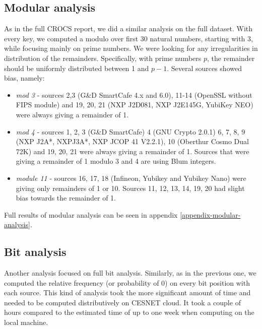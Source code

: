 \subsection{Modular analysis}

As in the full CROCS report\cite{svenda_full}, we did a similar analysis on the full dataset. With every key, we computed a modulo over first 30 natural numbers, starting with 3, while focusing mainly on prime numbers. We were looking for any irregularities in distribution of the remainders. Specifically, with prime numbers $p$, the remainder should be uniformly distributed between 1 and $p-1$. Several sources showed bias, namely:

\begin{itemize}

\item \textit{mod 3} - sources 2,3 (G\&D SmartCafe 4.x and 6.0), 11-14 (OpenSSL without FIPS module) and 19, 20, 21 (NXP J2D081, NXP J2E145G, YubiKey NEO) were always giving a remainder of 1.

\item \textit{mod 4} - sources 1, 2, 3 (G\&D SmartCafe) 4 (GNU Crypto 2.0.1) 6, 7, 8, 9 (NXP J2A*, NXPJ3A*, NXP JCOP 41 V2.2.1), 10 (Oberthur Cosmo Dual 72K) and 19, 20, 21 were always giving a remainder of 1. Sources that were giving a remainder of 1 modulo 3 and 4 are using Blum integers.

\item \textit{module 11} - sources 16, 17, 18 (Infineon, Yubikey and Yubikey Nano) were giving only remainders of 1 or 10. Sources 11, 12, 13, 14, 19, 20 had slight bias towards the remainder of 1.

\end{itemize}

\noindent
Full results of modular analysis can be seen in appendix \ref{appendix-modular-analysis}.

\subsection{Bit analysis}

Another analysis focused on full bit analysis. Similarly, as in the previous one, we computed the relative frequency (or probability of 0) on every bit position with each source. This kind of analysis took the more significant amount of time and needed to be computed distributively on CESNET cloud. It took a couple of hours compared to the estimated time of up to one week when computing on the local machine.

